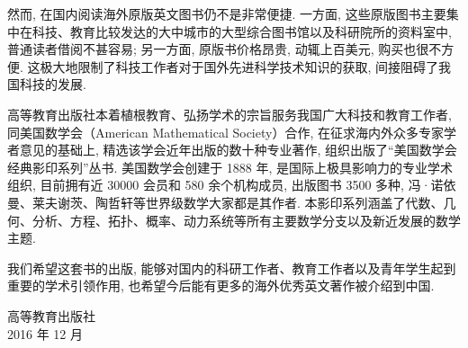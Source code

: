 然而, 在国内阅读海外原版英文图书仍不是非常便捷. 一方面, 这些原版图书主要集中在科技、教育比较发达的大中城市的大型综合图书馆以及科研院所的资料室中, 普通读者借阅不甚容易; 另一方面, 原版书价格昂贵, 动辄上百美元, 购买也很不方便. 这极大地限制了科技工作者对于国外先进科学技术知识的获取, 间接阻碍了我国科技的发展.

高等教育出版社本着植根教育、弘扬学术的宗旨服务我国广大科技和教育工作者, 同美国数学会（American Mathematical Society）合作, 在征求海内外众多专家学者意见的基础上, 精选该学会近年出版的数十种专业著作, 组织出版了“美国数学会经典影印系列”丛书. 美国数学会创建于 1888 年, 是国际上极具影响力的专业学术组织, 目前拥有近 30000 会员和 580 余个机构成员, 出版图书 3500 多种, 冯·诺依曼、莱夫谢茨、陶哲轩等世界级数学大家都是其作者. 本影印系列涵盖了代数、几何、分析、方程、拓扑、概率、动力系统等所有主要数学分支以及新近发展的数学主题.

我们希望这套书的出版, 能够对国内的科研工作者、教育工作者以及青年学生起到重要的学术引领作用, 也希望今后能有更多的海外优秀英文著作被介绍到中国.
\begin{flushright}高等教育出版社\\2016 年 12 月\end{flushright}
\clearpage
\endgroup

